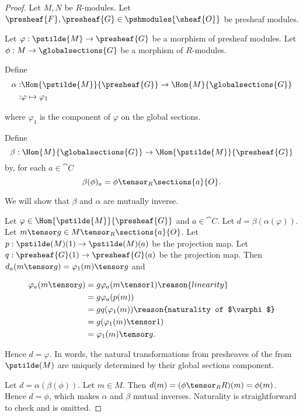 
\begin{proof}
Let $M,N$ be $R$-modules. 
Let $\presheaf{F},\presheaf{G} \in \pshmodules{\sheaf{O}}$ be presheaf modules.

Let $\varphi:\pstilde{M} \rightarrow \presheaf{G}$ be a morphism of presheaf modules.
Let $\phi: M \rightarrow \globalsections{G}$ be a morphism of $R$-modules.

Define
\begin{align*}
\alpha :& 
	\Hom{\pstilde{M}}{\presheaf{G}} \rightarrow \Hom{M}{\globalsections{G}} \\
	:& \varphi \mapsto \varphi_1
\end{align*}

where $\varphi_1$ is the component of $\varphi$ on the global sections.

Define 
\[\beta: 
	\Hom{M}{\globalsections{G}} \rightarrow \Hom{\pstilde{M}}{\presheaf{G}}
\] 
by, for each $a\in \cat{C}$
\[ \beta(\phi)_a = \phi \tensor_R \sections{a}{O}.\]

We will show that $\beta$ and $\alpha$ are mutually inverse. 

Let $\varphi \in \Hom{\pstilde{M}}{\presheaf{G}}$
and $a\in \cat{C}$.
Let $d = \beta(\alpha(\varphi))$. 
Let $m \tensor g \in M \tensor_R \sections{a}{O}$.
Let $p: \pstilde(M)(1)\rightarrow \pstilde(M)(a)$ be the projection map.
Let $q: \presheaf{G}(1)\rightarrow \presheaf{G}(a)$ be the projection map.
Then $d_a(m \tensor g) = \varphi_1(m) \tensor g$
and

\begin{align*}
	\varphi_a(m \tensor g) &=  g \varphi_a(m \tensor 1) \reason{linearity}\\
		&= g \varphi_a(p(m)) \\
		&= g q(\varphi_1(m)) \reason{naturality of $\varphi$}\\
		&= g (\varphi_1(m) \tensor 1) \\
		&= \varphi_1(m) \tensor g.
\end{align*}

Hence $d = \varphi$. 
In words, the natural transformations from presheaves of the from $\pstilde(M)$ 
are uniquely determined by their global sections component.

Let $d = \alpha(\beta(\phi))$. 
Let $m \in M$.
Then $d(m) = (\phi \tensor_R R)(m) = \phi(m)$.
Hence $d = \phi$, which makes $\alpha$ and $\beta$ mutual inverses.
Naturality is straightforward to check and is omitted.
\end{proof}